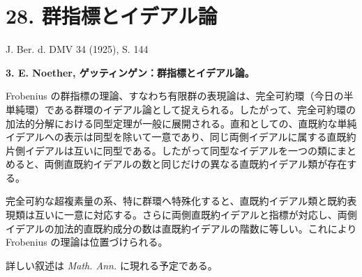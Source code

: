 \documentclass[11pt]{article}
\begin{document}
\section*{28. 群指標とイデアル論}

\begin{center}
J. Ber. d. DMV 34 (1925), S. 144
\end{center}

\textbf{3. E. Noether, ゲッティンゲン：群指標とイデアル論。}

Frobenius の群指標の理論、すなわち有限群の表現論は、完全可約環（今日の半単純環）である群環のイデアル論として捉えられる。したがって、完全可約環の加法的分解における同型定理が一般に展開される。直和としての、直既約な単純イデアルへの表示は同型を除いて一意であり、同じ両側イデアルに属する直既約片側イデアルは互いに同型である。したがって同型なイデアルを一つの類にまとめると、両側直既約イデアルの数と同じだけの異なる直既約イデアル類が存在する。

完全可約な超複素量の系、特に群環へ特殊化すると、直既約イデアル類と既約表現類は互いに一意に対応する。さらに両側直既約イデアルと指標が対応し、両側イデアルの加法的直既約成分の数は直既約イデアルの階数に等しい。これにより Frobenius の理論は位置づけられる。

詳しい叙述は \emph{Math. Ann.} に現れる予定である。
\end{document}
